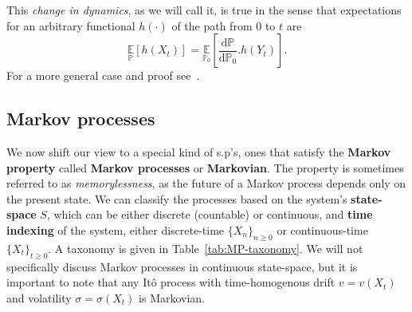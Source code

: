 \noindent
This \emph{change in dynamics}, as we will call it, is true in the sense that expectations for an arbitrary functional $h(\cdot)$ of the path from $0$ to $t$ are
\begin{equation}
	\label{eq:girsanov_consequence}
	\underset{\mathbb{P}}{\mathbb{E}}\left[h(X_t)\right] = \underset{\mathbb{P}_0}{\mathbb{E}}\left[\frac{\mathrm{d} \mathbb{P}}{\mathrm{d} \mathbb{P}_0}. h(Y_t)\right]. 
\end{equation}
For a more general case and proof see~\cite{sarkka2019applied}.

\subsection{Markov processes}
We now shift our view to a special kind of s.p's, ones that satisfy the \textbf{Markov property} called \textbf{Markov processes} or \textbf{Markovian}. The property is sometimes referred to as \emph{memorylessness}, as the future of a Markov process depends only on the present state. We can classify the processes based on the system's \textbf{state-space} $S$, which can be either discrete (countable) or continuous, and \textbf{time indexing} of the system, either discrete-time $\{X_n\}_{n \geq 0}$ or continuous-time $\{X_t\}_{t \geq 0}$. A taxonomy is given in Table~\ref{tab:MP-taxonomy}. We will not specifically discuss Markov processes in continuous state-space, but it is important to note that any It\^ o process with time-homogenous drift $v = v(X_t)$ and volatility $\sigma = \sigma(X_t)$ is Markovian.

